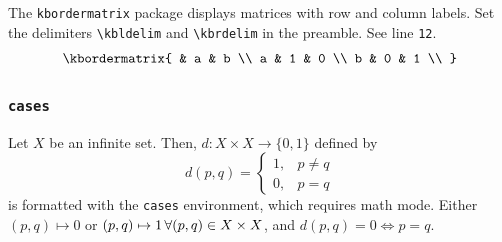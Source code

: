 \documentclass{article} 		%
\renewcommand{\kbldelim}{(} %
\renewcommand{\kbrdelim}{)} %
\begin{document}
The \texttt{kbordermatrix} package displays matrices with row and column labels. Set the delimiters \verb$\kbldelim$ and \verb$\kbrdelim$ in the preamble. See line \texttt{12}. 
\[
	\kbordermatrix
	{
		  & a & b \\
		a & 1 & 0 \\
		b & 0 & 1 \\
	}
\]

\subsubsection{\texttt{cases}} \label{subsubsec:cases}
\begin{definition*}
	Let $X$ be an infinite set. Then, $d:X \times X \to \{0,1\}$ defined by 
	\[
		d(p,q) = 
		\begin{cases}
			1, & p \neq q \\
			0, & p = q
		\end{cases}
	\]
	is formatted with the \texttt{cases} environment, which requires math mode. Either $(p,q) \mapsto 0$ or $(p,q) \mapsto 1 \,\forall (p,q) \in X \times X$, and $d(p,q) = 0 \iff p = q$. 
\end{definition*}
\end{document}
